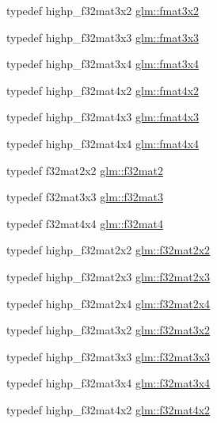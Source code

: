 \begin{DoxyCompactItemize}
\item 
typedef highp\-\_\-f32mat3x2 \hyperlink{group__gtc__type__precision_gab194ac1a68dbcb228384112ebe531c67}{glm\-::fmat3x2}
\item 
typedef highp\-\_\-f32mat3x3 \hyperlink{group__gtc__type__precision_ga577209f19554f5291cc3d66dda9a4388}{glm\-::fmat3x3}
\item 
typedef highp\-\_\-f32mat3x4 \hyperlink{group__gtc__type__precision_gad68d9daa91ef05b29e80e044931837cf}{glm\-::fmat3x4}
\item 
typedef highp\-\_\-f32mat4x2 \hyperlink{group__gtc__type__precision_ga9325d382b334066a4c90a814c9040359}{glm\-::fmat4x2}
\item 
typedef highp\-\_\-f32mat4x3 \hyperlink{group__gtc__type__precision_ga89195b7b13a41b0f1d34a962d1f66bfb}{glm\-::fmat4x3}
\item 
typedef highp\-\_\-f32mat4x4 \hyperlink{group__gtc__type__precision_ga16b508b75c7213ba6b24055ff3b7503d}{glm\-::fmat4x4}
\item 
typedef f32mat2x2 \hyperlink{group__gtc__type__precision_ga29b40a1141234160a627a540eceedd31}{glm\-::f32mat2}
\item 
typedef f32mat3x3 \hyperlink{group__gtc__type__precision_ga5fbaec59b220964f59403bb362b5f93e}{glm\-::f32mat3}
\item 
typedef f32mat4x4 \hyperlink{group__gtc__type__precision_ga47bc5ddfbd368423c9b762c03ba7e77f}{glm\-::f32mat4}
\item 
typedef highp\-\_\-f32mat2x2 \hyperlink{group__gtc__type__precision_gae7ebbb68656a5fd879d536b5d8452fb1}{glm\-::f32mat2x2}
\item 
typedef highp\-\_\-f32mat2x3 \hyperlink{group__gtc__type__precision_gac4573d3d213b2bce23943caef565a211}{glm\-::f32mat2x3}
\item 
typedef highp\-\_\-f32mat2x4 \hyperlink{group__gtc__type__precision_gab0eab14575c18077fd3415539bce685a}{glm\-::f32mat2x4}
\item 
typedef highp\-\_\-f32mat3x2 \hyperlink{group__gtc__type__precision_ga61653615c76194cdf3454e6e703525e0}{glm\-::f32mat3x2}
\item 
typedef highp\-\_\-f32mat3x3 \hyperlink{group__gtc__type__precision_ga715b36ea1e2d1ffaaef7517cc78b3877}{glm\-::f32mat3x3}
\item 
typedef highp\-\_\-f32mat3x4 \hyperlink{group__gtc__type__precision_ga9995b357aa1e9603adad780cfde1aa07}{glm\-::f32mat3x4}
\item 
typedef highp\-\_\-f32mat4x2 \hyperlink{group__gtc__type__precision_gab531a3d0479121732ae090254e0bd58f}{glm\-::f32mat4x2}

\end{DoxyCompactItemize}
